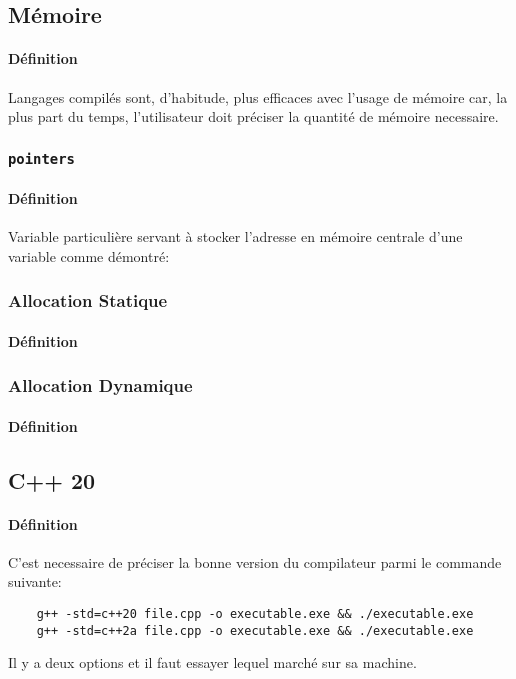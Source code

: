 \documentclass{article}
\begin{document}
\subsection{Mémoire}
\paragraph{Définition}Langages compilés sont, d'habitude, plus efficaces avec l'usage de mémoire car, la plus part du temps, l'utilisateur doit préciser la quantité de mémoire necessaire.
\subsubsection{\texttt{pointers}}
\paragraph{Définition}Variable particulière servant à stocker l'adresse en mémoire centrale d'une variable comme démontré:
\begin{scriptsize}
    \mycode
\end{scriptsize}

\subsubsection{Allocation Statique}
\paragraph{Définition}

\subsubsection{Allocation Dynamique}
\paragraph{Définition}

\subsection{C++ 20}
\paragraph{Définition}C'est necessaire de préciser la bonne version du compilateur parmi le commande suivante:
\begin{scriptsize}
    \mycode
    \begin{lstlisting}
    g++ -std=c++20 file.cpp -o executable.exe && ./executable.exe
    g++ -std=c++2a file.cpp -o executable.exe && ./executable.exe
    \end{lstlisting}
\end{scriptsize}
Il y a deux options et il faut essayer lequel marché sur sa machine.
\end{document}
